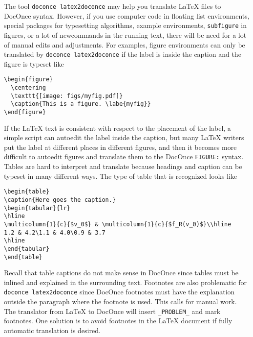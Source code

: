 \documentclass[%
oneside,                 %
final,                   %
10pt]{article}
\newcounter{doconce:movie:counter}
\newenvironment{notice_mdfboxadmon}[1][]{
\begin{notice_mdfboxmdframed}[frametitle=#1]
}
{
\end{notice_mdfboxmdframed}
}
\begin{document}
\begin{notice_mdfboxadmon}
The tool \texttt{doconce latex2doconce} may help you translate {\LaTeX} files
to DocOnce syntax. However, if you use computer code in floating
list environments, special packages for typesetting algorithms,
example environments, \texttt{subfigure} in figures,
or a lot of newcommands in the running text, there will be need for
a lot of manual edits and adjustments.
For examples, figure environments can only be translated by
\texttt{doconce latex2doconce} if the label is inside the caption and
the figure is typeset like
\begin{Verbatim}[numbers=none,fontsize=\fontsize{9pt}{9pt},baselinestretch=0.95,xleftmargin=2mm]
\begin{figure}
  \centering
  \texttt{[image: figs/myfig.pdf]}
  \caption{This is a figure. \labe{myfig}}
\end{figure}

\end{Verbatim}

If the {\LaTeX} text is consistent with respect to the placement of the label, a
simple script can autoedit the label inside the caption, but many
{\LaTeX} writers put the label at different places in different figures,
and then it becomes more difficult to autoedit figures and translate
them to the DocOnce \texttt{FIGURE:} syntax.
Tables are hard to interpret and translate because headings and
caption can be typeset in many different ways. The type of table
that is recognized looks like
\begin{Verbatim}[numbers=none,fontsize=\fontsize{9pt}{9pt},baselinestretch=0.95,xleftmargin=2mm]
\begin{table}
\caption{Here goes the caption.}
\begin{tabular}{lr}
\hline
\multicolumn{1}{c}{$v_0$} & \multicolumn{1}{c}{$f_R(v_0)$}\\hline
1.2 & 4.2\1.1 & 4.0\0.9 & 3.7
\hline
\end{tabular}
\end{table}

\end{Verbatim}

Recall that table captions do not make sense in DocOnce since tables
must be inlined and explained in the surrounding text.
Footnotes are also problematic for \texttt{doconce latex2doconce} since DocOnce
footnotes must have the explanation outside the paragraph where the
footnote is used. This calls for manual work. The translator from
{\LaTeX} to DocOnce will insert \Verb!_PROBLEM_! and mark footnotes. One
solution is to avoid footnotes in the {\LaTeX} document if fully automatic
translation is desired.
\end{notice_mdfboxadmon} %
\end{document}
